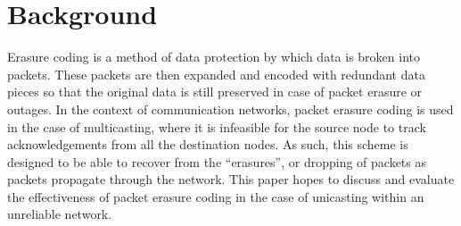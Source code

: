 \section{Background}
\label{sec:background}

Erasure coding is a method of data protection by which data is 
broken into packets. These packets are then expanded and encoded 
with redundant data pieces so that the original data is still preserved 
in case of packet erasure or outages. In the context of communication 
networks, packet erasure coding \cite{WalrandParekh2017} is used in the case of multicasting, 
where it is infeasible for the source node to track acknowledgements from 
all the destination nodes. As such, this scheme is designed to be able to 
recover from the “erasures”, or dropping of packets as packets propagate 
through the network. This paper hopes to discuss and evaluate the effectiveness of packet
erasure coding in the case of unicasting within an unreliable network.

